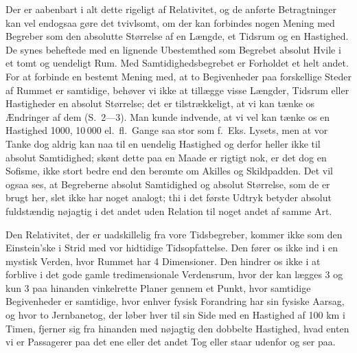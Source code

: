 \documentclass[12pt,a4paper]{article}
\newcommand{\opage}[1]{\marginnote{\footnotesize\textit{[#1]}}}
\begin{document}
Der er aabenbart i alt dette rigeligt af \guillemotright
Relativitet\guillemotleft, og de anførte Betragtninger kan vel endogsaa gøre
det tvivlsomt, om der kan forbindes nogen Mening med Begreber som den absolutte
Størrelse af en Længde, et Tidsrum og en Hastighed. De synes beheftede med en
lignende Ubestemthed som Begrebet absolut Hvile i et tomt og uendeligt Rum. Med
Samtidighedsbegrebet er Forholdet et helt andet. For at forbinde en bestemt
Mening med, at to Begivenheder paa forskellige Steder af Rummet er samtidige,
behøver vi ikke at tillægge visse Længder, Tidsrum eller Hastigheder en absolut
Størrelse; det er tilstrækkeligt, at vi kan tænke os Ændringer af dem
(S.~2---3). Man kunde indvende, at vi vel kan tænke os en Hastighed 1000,
10\,000 el.\ fl.\ Gange saa stor som f.~Eks. Lysets, men
\opage{13} at vor Tanke dog aldrig kan naa til en uendelig Hastighed og derfor heller ikke
til \guillemotright absolut\guillemotleft{} Samtidighed; skønt dette paa en
Maade er rigtigt nok, er det dog en Sofisme, ikke stort bedre end den berømte
om Akilles og Skildpadden. Det vil ogsaa ses, at Begreberne \guillemotright
absolut Samtidighed\guillemotleft{} og \guillemotright absolut
Størrelse\guillemotleft, som de er brugt her, slet ikke har noget analogt; thi
i det første Udtryk betyder \guillemotright absolut\guillemotleft{}
\guillemotright fuldstændig nøjagtig\guillemotleft{} i det andet
\guillemotright uden Relation til noget andet af samme Art\guillemotleft.

Den Relativitet, der er uadskillelig fra vore Tidsbegreber, kommer ikke som den
Einstein'ske i Strid med vor hidtidige Tidsopfattelse. Den fører os ikke ind i
en mystisk Verden, hvor Rummet har 4 Dimensioner. Den hindrer os ikke i at
forblive i det gode gamle tredimensionale Verdensrum, hvor der kan lægges 3 og
kun 3 paa hinanden vinkelrette Planer gennem et Punkt, hvor samtidige
Begivenheder er samtidige, hvor enhver fysisk Forandring har sin fysiske
Aarsag, og hvor to Jernbanetog, der løber hver til sin Side med en Hastighed af
100 km i Timen, fjerner sig fra hinanden med nøjagtig den dobbelte Hastighed,
hvad enten vi er Passagerer paa det ene eller det andet Tog eller staar
udenfor og ser paa.
\end{document}
